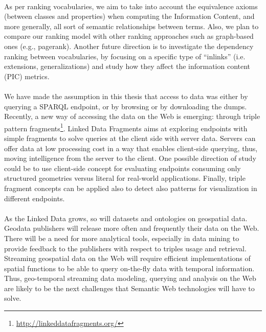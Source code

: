 \documentclass[a4paper,11pt,twoside]{report}
\begin{document}
\paragraph{}
 As per ranking vocabularies, we aim to take into account the equivalence axioms (between classes and properties) when computing the Information Content, and more generally, all sort of semantic relationships between terms. Also, we plan to compare our ranking model with other ranking approaches such as graph-based ones (e.g., pagerank). Another future direction is to investigate the dependency ranking between vocabularies, by focusing on a specific type of ``inlinks'' (i.e. extensions, generalizations) and study how they affect the information content (PIC) metrics.


\paragraph{}
We have made the assumption in this thesis that access to data was either by  querying a SPARQL endpoint, or by browsing or by downloading the dumps. Recently, a new way of accessing the data on the Web is emerging: through triple pattern fragments\footnote{\url{http://linkeddatafragments.org/}}. Linked Data Fragments \cite{verborgh2014ldf} aims at exploring endpoints with simple fragments to solve queries at the client side with server data.
Servers can offer data at low processing cost in a way that enables client-side querying, thus, moving intelligence from the server to the client. One possible direction of study could be to use client-side concept for evaluating endpoints consuming only structured geometries versus literal for real-world applications. Finally, triple fragment concepts can be applied also to detect also patterns for visualization in different endpoints.
 

\paragraph{}
As the Linked Data grows, so will datasets and ontologies on geospatial data. Geodata publishers will release more often and frequently their data on the Web. There will be a need for more analytical tools, especially in data mining to provide feedback to the publishers with respect to triples usage and retrieval. Streaming geospatial data on the Web will require efficient implementations of spatial functions to be able to query on-the-fly data with temporal information. Thus, geo-temporal streaming data modeling, querying and analysis on the Web are likely to be the next challenges that Semantic Web technologies will have to solve.  
\end{document}
